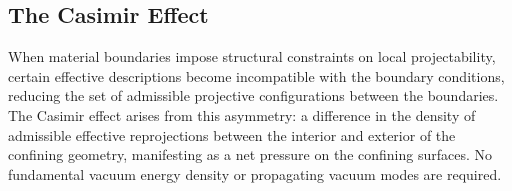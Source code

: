 \subsection{The Casimir Effect}
  \label{subsec:casimir-effect}

  When material boundaries impose structural constraints on local projectability,
  certain effective descriptions become incompatible with the boundary conditions,
  reducing the set of admissible projective configurations between the boundaries.
  The Casimir effect arises from this asymmetry: a difference in the density of admissible
  effective reprojections between the interior and exterior of the confining geometry,
  manifesting as a net pressure on the confining surfaces.
  No fundamental vacuum energy density or propagating vacuum modes are required.
